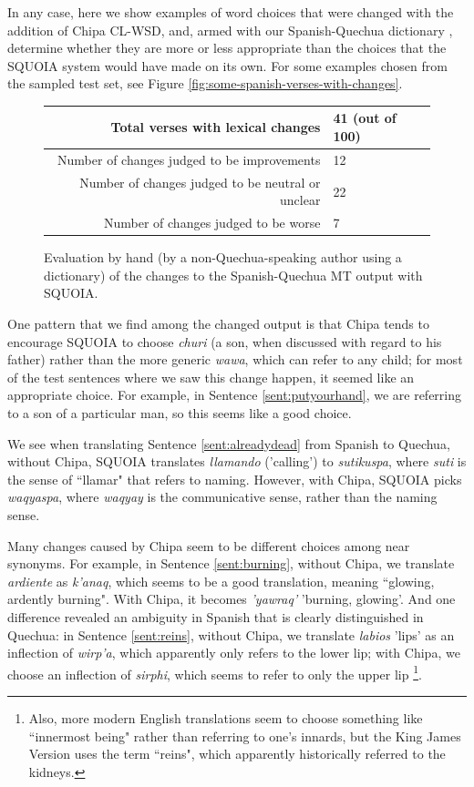 In any case, here we show examples of word choices that were changed with the
addition of Chipa CL-WSD, and, armed with our Spanish-Quechua dictionary
\cite{academiamayor}, determine whether they are more or less appropriate than
the choices that the SQUOIA system would have made on its own. For some
examples chosen from the sampled test set, see Figure
\ref{fig:some-spanish-verses-with-changes}.

\begin{figure}
  \begin{centering}
  \begin{tabulary}{\textwidth}{|R|L|}
    \hline
    Total verses with lexical changes & 41 (out of 100) \\
    \hline
    Number of changes judged to be improvements &  12 \\
    \hline
    Number of changes judged to be neutral or unclear &  22 \\
    \hline
    Number of changes judged to be worse &  7 \\
    \hline
  \end{tabulary}
  \end{centering}
  \caption{Evaluation by hand (by a non-Quechua-speaking author using a
  dictionary) of the changes to the Spanish-Quechua MT output with SQUOIA.}
  \label{fig:es-qu-evaluation}
\end{figure}

One pattern that we find among the changed output is that Chipa tends to
encourage SQUOIA to choose \emph{churi} (a son, when discussed with regard to
his father) rather than the more generic \emph{wawa}, which can refer to any
child; for most of the test sentences where we saw this change happen, it
seemed like an appropriate choice. For example, in Sentence
\ref{sent:putyourhand}, we are referring to a son of a particular man, so this
seems like a good choice.

We see when translating Sentence \ref{sent:alreadydead}  from Spanish to
Quechua, without Chipa, SQUOIA translates \emph{llamando} ('calling') to
\emph{sutikuspa}, where \emph{suti} is the sense of ``llamar" that refers to
naming. However, with Chipa, SQUOIA picks \emph{waqyaspa}, where \emph{waqyay}
is the communicative sense, rather than the naming sense.

Many changes caused by Chipa seem to be different choices among near synonyms.
For example, in Sentence \ref{sent:burning}, without Chipa, we translate
\emph{ardiente} as \emph{k'anaq}, which seems to be a good translation, meaning
``glowing, ardently burning". With Chipa, it becomes \emph{'yawraq'} 'burning,
glowing'. And one difference revealed an ambiguity in Spanish that is clearly
distinguished in Quechua: in Sentence \ref{sent:reins}, without Chipa, we
translate \emph{labios} 'lips' as an inflection of \emph{wirp'a}, which
apparently only refers to the lower lip; with Chipa, we choose an inflection of
\emph{sirphi}, which seems to refer to only the upper lip
\footnote{Also, more modern English translations seem to choose something like
``innermost being" rather than referring to one's innards, but the King James
Version uses the term ``reins", which apparently historically referred to the
kidneys.}.

